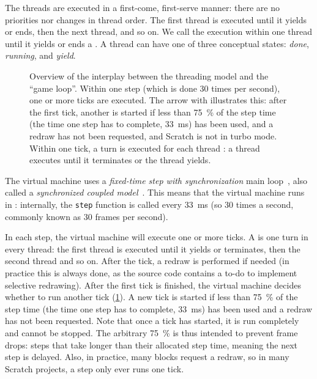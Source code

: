 \documentclass[../main]{subfiles}
\begin{document}
The threads are executed in a first-come, first-serve manner: there are no priorities nor changes in thread order.
The first thread is executed until it yields or ends, then the next thread, and so on.
We call the execution within one thread until it yields or ends a .
A thread can have one of three conceptual states: \emph{done}, \emph{running}, and \emph{yield}.

\begin{figure}
    \centering
    
    \caption{Overview of the interplay between the threading model and the ``game loop''. Within one step (which is done 30 times per second), one or more ticks are executed. The arrow with  illustrates this: after the first tick, another is started if less than \qty{75}{\percent} of the step time (the time one step has to complete, \qty{33}{\milli\second}) has been used, and a redraw has not been requested, and Scratch is not in turbo mode. Within one tick, a turn is executed for each thread : a thread executes until it terminates or the thread yields.}
    \label{fig:scratch-model-explained}
\end{figure}

The virtual machine uses a \emph{fixed-time step with synchronization} main loop~\autocite{nystromGameProgrammingPatterns2014}, also called a \emph{synchronized coupled model}~\autocite{valenteRealTimeGame2005}.
This means that the virtual machine runs in : internally, the \texttt{step} function is called every \qty{33}{\milli\second} (so 30 times a second, commonly known as 30 frames per second).

In each step, the virtual machine will execute one or more ticks.
A  is one turn in every thread: the first thread is executed until it yields or terminates, then the second thread and so on.
After the tick, a redraw is performed if needed (in practice this is always done, as the source code contains a to-do to implement selective redrawing).
After the first tick is finished, the virtual machine decides whether to run another tick (\cref{fig:scratch-model-explained}).
A new tick is started if less than \qty{75}{\percent} of the step time (the time one step has to complete, \qty{33}{\milli\second}) has been used and a redraw has not been requested.
Note that once a tick has started, it is run completely and cannot be stopped.
The arbitrary \qty{75}{\percent} is thus intended to prevent frame drops: steps that take longer than their allocated step time, meaning the next step is delayed.
Also, in practice, many blocks request a redraw, so in many Scratch projects, a step only ever runs one tick.
\end{document}
